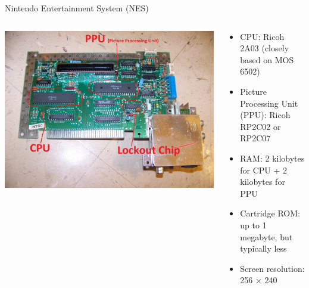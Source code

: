 \begin{frame}{Nintendo Entertainment System (NES)}
	\begin{columns}
		\begin{column}{0.32\textwidth}
			\includegraphics[width=\textwidth]{nes_motherboard}
		\end{column}
		\begin{column}{0.64\textwidth}
			\begin{itemize}
				\pause\item CPU: Ricoh 2A03 (closely based on MOS 6502)
				\pause\item Picture Processing Unit (PPU): Ricoh RP2C02 or RP2C07
				\pause\item RAM: 2 kilobytes for CPU + 2 kilobytes for PPU
				\pause\item Cartridge ROM: up to 1 megabyte, but typically less
				\pause\item Screen resolution: 256 $\times$ 240
			\end{itemize}
		\end{column}
	\end{columns}
\end{frame}

